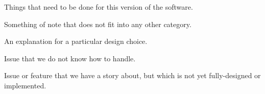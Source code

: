 \begin{TODO}
  Things that need to be done for this version of the software.
\end{TODO}

\begin{note}
  Something of note that does not fit into any other category.
\end{note}

\begin{rationale}
  An explanation for a particular design choice.
\end{rationale}

\begin{openissue}
  Issue that we do not know how to handle.
\end{openissue}

\begin{future}
  Issue or feature that we have a story about, but which is not yet
  fully-designed or implemented. 
\end{future}

